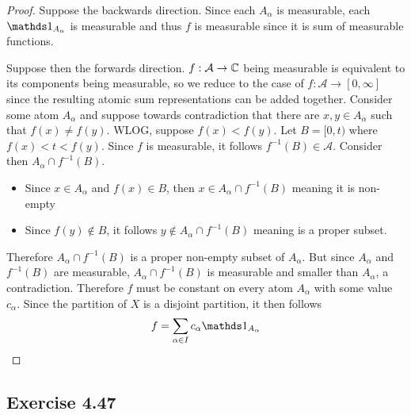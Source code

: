 \documentclass[hw_all.tex]{subfiles}
\begin{document}
\begin{proof}
    Suppose the backwards direction. Since each $A_{\alpha}$ is measurable, each $\ind{A_{\alpha}}$ is measurable and thus $f$ is measurable since it is sum of measurable functions.

    Suppose then the forwards direction. $f : \mathcal{A} \to \mathbb{C}$ being measurable is equivalent to its components being measurable, so we reduce to the case of $f : \mathcal{A} \to [0,\infty]$ since the resulting atomic sum representations can be added together. Consider some atom $A_{\alpha}$ and suppose towards contradiction that there are $x,y \in A_{\alpha}$ such that $f(x) \neq f(y)$. WLOG, suppose $f(x) < f(y)$. Let $B = [0, t)$ where $f(x) < t < f(y)$. Since $f$ is measurable, it follows $f^{-1}(B) \in \mathcal{A}$. Consider then $A_{\alpha} \cap f^{-1}(B)$.

    \begin{itemize}
        \item Since $x \in A_{\alpha}$ and $f(x) \in B$, then $x \in A_{\alpha} \cap f^{-1}(B)$ meaning it is non-empty
        \item Since $f(y) \notin B$, it follows $y \notin A_{\alpha} \cap f^{-1}(B)$ meaning is a proper subset.
    \end{itemize}

    Therefore $A_{\alpha} \cap f^{-1}(B)$ is a proper non-empty subset of $A_{\alpha}$. But since $A_{\alpha}$ and $f^{-1}(B)$ are measurable, $A_{\alpha} \cap f^{-1}(B)$ is measurable and smaller than $A_{\alpha}$, a contradiction. Therefore $f$ must be constant on every atom $A_{\alpha}$ with some value $c_{\alpha}$. Since the partition of $X$ is a disjoint partition, it then follows
    \[
        f = \sum_{\alpha \in I} c_{\alpha} \ind{A_{\alpha}} \qedhere
    \]
\end{proof}

\subsection{Exercise 4.47}
\end{document}
